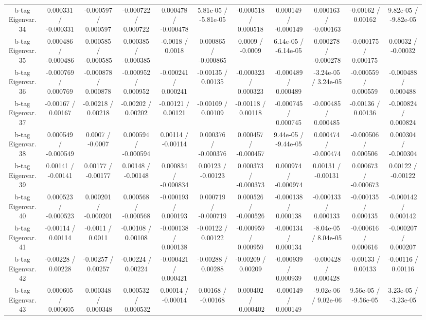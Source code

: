 {\begin{landscape}
\begin{longtable}{@{\extracolsep{\fill}}| *{11}{c|}}
  b-tag Eigenvar. 34 & 0.000331 / -0.000331 & -0.000597 / 0.000597 & -0.000722 / 0.000722 & 0.000478 / -0.000478 & 5.81e-05 / -5.81e-05 & -0.000518 / 0.000518 & 0.000149 / -0.000149 & 0.000163 / -0.000163 & -0.00162 / 0.00162 & 9.82e-05 / -9.82e-05 \\ 
  b-tag Eigenvar. 35 & 0.000486 / -0.000486 & 0.000585 / -0.000585 & 0.000385 / -0.000385 & -0.0018 / 0.0018 & 0.000865 / -0.000865 & 0.0009 / -0.0009 & 6.14e-05 / -6.14e-05 & 0.000278 / -0.000278 & -0.000175 / 0.000175 & 0.00032 / -0.00032 \\ 
  b-tag Eigenvar. 36 & -0.000769 / 0.000769 & -0.000878 / 0.000878 & -0.000952 / 0.000952 & -0.000241 / 0.000241 & -0.00135 / 0.00135 & -0.000323 / 0.000323 & -0.000489 / 0.000489 & -3.24e-05 / 3.24e-05 & -0.000559 / 0.000559 & -0.000488 / 0.000488 \\ 
  b-tag Eigenvar. 37 & -0.00167 / 0.00167 & -0.00218 / 0.00218 & -0.00202 / 0.00202 & -0.00121 / 0.00121 & -0.00109 / 0.00109 & -0.00118 / 0.00118 & -0.000745 / 0.000745 & -0.000485 / 0.000485 & -0.00136 / 0.00136 & -0.000824 / 0.000824 \\ 
  b-tag Eigenvar. 38 & 0.000549 / -0.000549 & 0.0007 / -0.0007 & 0.000594 / -0.000594 & 0.00114 / -0.00114 & 0.000376 / -0.000376 & 0.000457 / -0.000457 & 9.44e-05 / -9.44e-05 & 0.000474 / -0.000474 & -0.000506 / 0.000506 & 0.000304 / -0.000304 \\ 
  b-tag Eigenvar. 39 & 0.00141 / -0.00141 & 0.00177 / -0.00177 & 0.00148 / -0.00148 & 0.000834 / -0.000834 & 0.00123 / -0.00123 & 0.000373 / -0.000373 & 0.000974 / -0.000974 & 0.00131 / -0.00131 & 0.000673 / -0.000673 & 0.00122 / -0.00122 \\ 
  b-tag Eigenvar. 40 & 0.000523 / -0.000523 & 0.000201 / -0.000201 & 0.000568 / -0.000568 & -0.000193 / 0.000193 & 0.000719 / -0.000719 & 0.000526 / -0.000526 & -0.000138 / 0.000138 & -0.000133 / 0.000133 & -0.000135 / 0.000135 & -0.000142 / 0.000142 \\ 
  b-tag Eigenvar. 41 & -0.00114 / 0.00114 & -0.0011 / 0.0011 & -0.00108 / 0.00108 & -0.000138 / 0.000138 & -0.00122 / 0.00122 & -0.000959 / 0.000959 & -0.000134 / 0.000134 & -8.04e-05 / 8.04e-05 & -0.000616 / 0.000616 & -0.000207 / 0.000207 \\ 
  b-tag Eigenvar. 42 & -0.00228 / 0.00228 & -0.00257 / 0.00257 & -0.00224 / 0.00224 & -0.000421 / 0.000421 & -0.00288 / 0.00288 & -0.00209 / 0.00209 & -0.000939 / 0.000939 & -0.000428 / 0.000428 & -0.00133 / 0.00133 & -0.00116 / 0.00116 \\ 
  b-tag Eigenvar. 43 & 0.000605 / -0.000605 & 0.000348 / -0.000348 & 0.000532 / -0.000532 & 0.00014 / -0.00014 & 0.00168 / -0.00168 & 0.000402 / -0.000402 & -0.000149 / 0.000149 & -9.02e-06 / 9.02e-06 & 9.56e-05 / -9.56e-05 & 3.23e-05 / -3.23e-05 \\ 

\end{longtable}
\end{landscape}}
